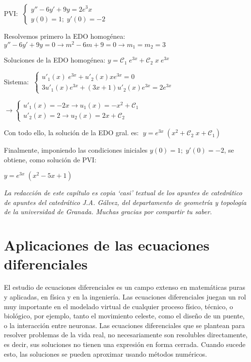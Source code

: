\begin{ejem}
	PVI: $\; \begin{cases} y''-6y'+9y=2e^3x \\ y(0)=1; \; y'(0)=-2 \end{cases}$

Resolvemos primero la EDO homogénea: $y''-6y'+9y=0 \to m^2-6m+9=0 \to m_1=m_2=3$

Soluciones de la EDO homogénea: $y=\mathcal{C}_1 \; e^{3x} + \mathcal{C}_2\; x \; e^{3x}$

Sistema: $\; \begin{cases}
 u'_1(x)\; e^{3x} + u'_2(x) x e^{3x} =0 \\
 3u'_1(x) e^{3x}+(3x+1) u'_2(x) e^{3x}=2 e^{3x}	
 \end{cases} 	$
 
 $\to \begin{cases}
 u'_1(x)= -2x \to u_1(x)=-x^2 + \mathcal{C}_1 \\
 u'_2(x)=2 \to u_2(x)=2x+\mathcal{C}_2	
 \end{cases}$
 
 Con todo ello, la solución de la EDO gral. es:  $\; y=e^{3x}\; (x^2+\mathcal{C}_2\; x + \mathcal{C}_1)$
 
 Finalmente, imponiendo las condiciones iniciales $y(0)=1; \; y'(0)=-2$, se obtiene, como solución de PVI:
 
 \hspace{30mm} $y=e^{3x}\; (x^2-5x+1)$
 

\end{ejem}



\textit{La redacción de este capítulo es copia `casi' textual de los apuntes de catedrático de apuntes del catedrático J.A. Gálvez, del departamento de geometría y topología de la universidad de Granada. Muchas gracias por compartir tu saber.}

\section{Aplicaciones de las ecuaciones diferenciales}


\vspace{3mm}

\textcolor{gris}{
El estudio de ecuaciones diferenciales es un campo extenso en matemáticas puras y  aplicadas, en física y en la ingeniería. Las ecuaciones diferenciales juegan un rol muy importante en el modelado virtual de cualquier proceso físico, técnico, o biológico, por ejemplo, tanto el movimiento celeste, como el diseño de un puente, o la interacción entre neuronas. Las ecuaciones diferenciales que se plantean para resolver problemas de la vida real, no necesariamente son resolubles directamente, es decir, sus soluciones no tienen una expresión en forma cerrada. Cuando sucede esto, las soluciones se pueden aproximar usando métodos numéricos.}

